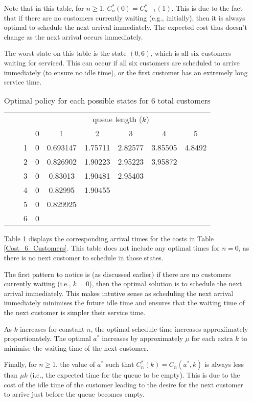 Note that in this table, for $n \geq 1$, $C_{n}^{*} (0) = C_{n - 1}^{*} (1)$. This is due to the fact that if there are no customers currently waiting (e.g., initially), then it is always optimal to schedule the next arrival immediately. The expected cost thus doesn't change as the next arrival occurs immediately.

The worst state on this table is the state $(0, 6)$, which is all six customers waiting for serviced. This can occur if all six customers are scheduled to arrive immediately (to ensure no idle time), or the first customer has an extremely long service time.

\begin{table}[htb]
	\centering
	\begin{tabular}{c c c || c | c | c | c | c | c}
		& & & \multicolumn{6}{c}{queue length ($k$)} \\
		& & & 0 & 1 & 2 & 3 & 4 & 5 \\ \hline \hline
		\parbox[t]{2mm}{} & \parbox[t]{2mm}{} & 1 & 0 & 0.693147 & 1.75711 & 2.82577 & 3.85505 & 4.8492 \\
		& & 2 & 0 & 0.826902 & 1.90223 & 2.95223 & 3.95872 & \\
		& & 3 & 0 & 0.83013 & 1.90481 & 2.95403 & & \\
		& & 4 & 0 & 0.82995 & 1.90455 & & & \\
		& & 5 & 0 & 0.829925 & & & & \\
		& & 6 & 0 & & & & & \\
	\end{tabular}
	\caption{Optimal policy for each possible states for 6 total customers}
	\label{Policy_6_Customers}
\end{table}

Table \ref{Policy_6_Customers} displays the corresponding arrival times for the costs in Table \ref{Cost_6_Customers}. This table does not include any optimal times for $n = 0$, as there is no next customer to schedule in those states.

The first pattern to notice is (as discussed earlier) if there are no customers currently waiting (i.e., $k = 0$), then the optimal solution is to schedule the next arrival immediately. This makes intutive sense as scheduling the next arrival immediately minimises the future idle time and ensures that the waiting time of the next customer is simpler their service time.

As $k$ increases for constant $n$, the optimal schedule time increases approxiimately proportionately. The optimal $a^{*}$ increases by approximately $\mu$ for each extra $k$ to minimise the waiting time of the next customer.

Finally, for $n \geq 1$, the value of $a^{*}$ such that $C_{n}^{*} (k) = C_{n} (a^{*}, k)$ is always less than $\mu k$ (i.e., the expected time for the queue to be empty). This is due to the cost of the idle time of the customer leading to the desire for the next customer to arrive just before the queue becomes empty.